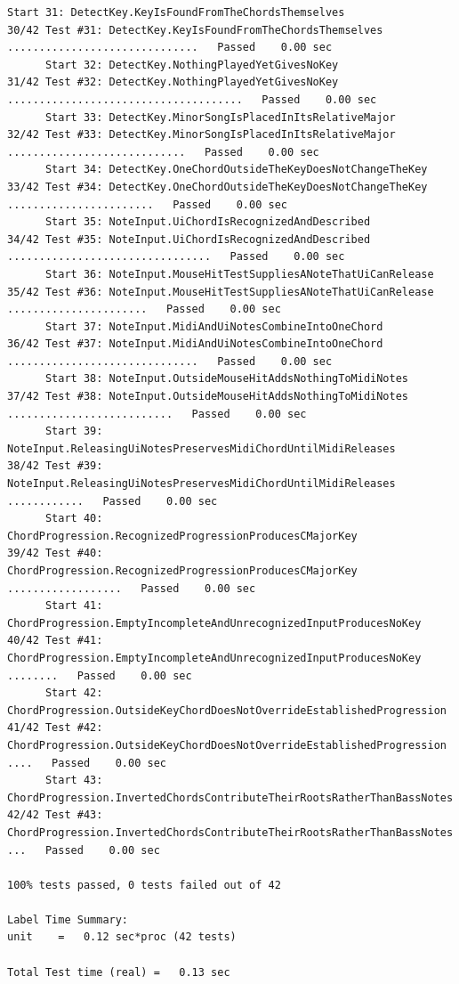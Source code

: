 \documentclass[10pt,letterpaper]{article}
\begin{document}
\begin{lstlisting}[basicstyle=\ttfamily\tiny]
      Start 31: DetectKey.KeyIsFoundFromTheChordsThemselves
30/42 Test #31: DetectKey.KeyIsFoundFromTheChordsThemselves ..............................   Passed    0.00 sec
      Start 32: DetectKey.NothingPlayedYetGivesNoKey
31/42 Test #32: DetectKey.NothingPlayedYetGivesNoKey .....................................   Passed    0.00 sec
      Start 33: DetectKey.MinorSongIsPlacedInItsRelativeMajor
32/42 Test #33: DetectKey.MinorSongIsPlacedInItsRelativeMajor ............................   Passed    0.00 sec
      Start 34: DetectKey.OneChordOutsideTheKeyDoesNotChangeTheKey
33/42 Test #34: DetectKey.OneChordOutsideTheKeyDoesNotChangeTheKey .......................   Passed    0.00 sec
      Start 35: NoteInput.UiChordIsRecognizedAndDescribed
34/42 Test #35: NoteInput.UiChordIsRecognizedAndDescribed ................................   Passed    0.00 sec
      Start 36: NoteInput.MouseHitTestSuppliesANoteThatUiCanRelease
35/42 Test #36: NoteInput.MouseHitTestSuppliesANoteThatUiCanRelease ......................   Passed    0.00 sec
      Start 37: NoteInput.MidiAndUiNotesCombineIntoOneChord
36/42 Test #37: NoteInput.MidiAndUiNotesCombineIntoOneChord ..............................   Passed    0.00 sec
      Start 38: NoteInput.OutsideMouseHitAddsNothingToMidiNotes
37/42 Test #38: NoteInput.OutsideMouseHitAddsNothingToMidiNotes ..........................   Passed    0.00 sec
      Start 39: NoteInput.ReleasingUiNotesPreservesMidiChordUntilMidiReleases
38/42 Test #39: NoteInput.ReleasingUiNotesPreservesMidiChordUntilMidiReleases ............   Passed    0.00 sec
      Start 40: ChordProgression.RecognizedProgressionProducesCMajorKey
39/42 Test #40: ChordProgression.RecognizedProgressionProducesCMajorKey ..................   Passed    0.00 sec
      Start 41: ChordProgression.EmptyIncompleteAndUnrecognizedInputProducesNoKey
40/42 Test #41: ChordProgression.EmptyIncompleteAndUnrecognizedInputProducesNoKey ........   Passed    0.00 sec
      Start 42: ChordProgression.OutsideKeyChordDoesNotOverrideEstablishedProgression
41/42 Test #42: ChordProgression.OutsideKeyChordDoesNotOverrideEstablishedProgression ....   Passed    0.00 sec
      Start 43: ChordProgression.InvertedChordsContributeTheirRootsRatherThanBassNotes
42/42 Test #43: ChordProgression.InvertedChordsContributeTheirRootsRatherThanBassNotes ...   Passed    0.00 sec

100% tests passed, 0 tests failed out of 42

Label Time Summary:
unit    =   0.12 sec*proc (42 tests)

Total Test time (real) =   0.13 sec
\end{lstlisting}
\end{document}
